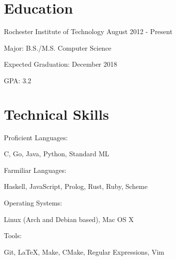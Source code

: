 \documentclass[a4paper,margin,line]{resume}
\newcommand{\rdate}[1]{\hfill {\small #1}}
\begin{document}
\begin{resume}

\section{\mysidestyle Education}
\begin{compactdesc}
    \item[Rochester Institute of Technology] \rdate{August 2012 - Present}
    \begin{asparablank} { \small
        \item Major: B.S./M.S. Computer Science
        \item Expected Graduation: December 2018
        \item GPA: 3.2
    } \end{asparablank}
\end{compactdesc}

\section{\mysidestyle Technical Skills}
\begin{compactdesc}
    \item[Proficient Languages:]
    \begin{asparablank} {\small
        \item C, Go, Java, Python, Standard ML
    } \end{asparablank}

    \item[Farmiliar Languages:]
    \begin{asparablank} {\small
        \item Haskell, JavaScript, Prolog, Rust, Ruby, Scheme
    } \end{asparablank}

    \item[Operating Systems:]
    \begin{asparablank} {\small
        \item Linux (Arch and Debian based), Mac OS X
    } \end{asparablank}

    \item[Tools:]
    \begin{asparablank} { \small
        \item Git, \LaTeX, Make, CMake, Regular Expressions, Vim
    } \end{asparablank}
\end{compactdesc}


\end{resume}
\end{document}
